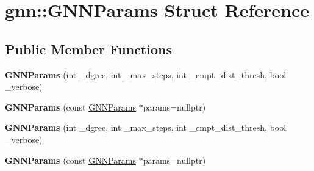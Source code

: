 \hypertarget{structgnn_1_1GNNParams}{\section{gnn\-:\-:G\-N\-N\-Params Struct Reference}
\label{structgnn_1_1GNNParams}
}
\subsection*{Public Member Functions}
\begin{DoxyCompactItemize}
\item 
\hypertarget{structgnn_1_1GNNParams_a74afc84fec78df4ce57a44ef0145b1ac}{{\bfseries G\-N\-N\-Params} (int \-\_\-dgree, int \-\_\-max\-\_\-steps, int \-\_\-cmpt\-\_\-dist\-\_\-thresh, bool \-\_\-verbose)}\label{structgnn_1_1GNNParams_a74afc84fec78df4ce57a44ef0145b1ac}

\item 
\hypertarget{structgnn_1_1GNNParams_adcb6594bc3f8fa667738ad8d42bca387}{{\bfseries G\-N\-N\-Params} (const \hyperlink{structgnn_1_1GNNParams}{G\-N\-N\-Params} $\ast$params=nullptr)}\label{structgnn_1_1GNNParams_adcb6594bc3f8fa667738ad8d42bca387}

\item 
\hypertarget{structgnn_1_1GNNParams_a74afc84fec78df4ce57a44ef0145b1ac}{{\bfseries G\-N\-N\-Params} (int \-\_\-dgree, int \-\_\-max\-\_\-steps, int \-\_\-cmpt\-\_\-dist\-\_\-thresh, bool \-\_\-verbose)}\label{structgnn_1_1GNNParams_a74afc84fec78df4ce57a44ef0145b1ac}

\item 
\hypertarget{structgnn_1_1GNNParams_adcb6594bc3f8fa667738ad8d42bca387}{{\bfseries G\-N\-N\-Params} (const \hyperlink{structgnn_1_1GNNParams}{G\-N\-N\-Params} $\ast$params=nullptr)}\label{structgnn_1_1GNNParams_adcb6594bc3f8fa667738ad8d42bca387}

\end{DoxyCompactItemize}
